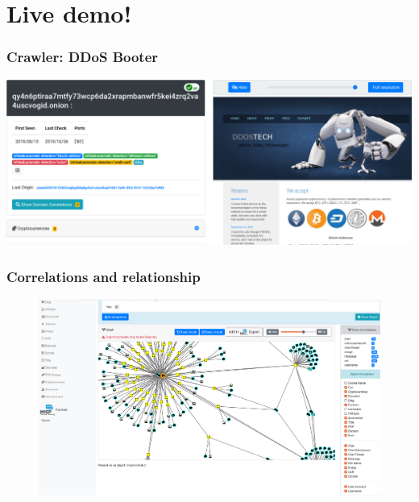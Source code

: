 \documentclass[10pt,aspectratio=169, colorlinks=true, linkcolor=circlBlue]{beamer}
\begin{document}
\section{Live demo!}

\begin{frame}
    \frametitle{Crawler: DDoS Booter}
    \centerline{
        \includegraphics[scale=0.23]{images/crawled-ddos.png}
    }
\end{frame}

\begin{frame}
    \frametitle{Correlations and relationship}
    \begin{figure}
        \includegraphics[scale=0.18, angle=0]{screenshot/correlation.png}
    \end{figure}
\end{frame}
\end{document}
